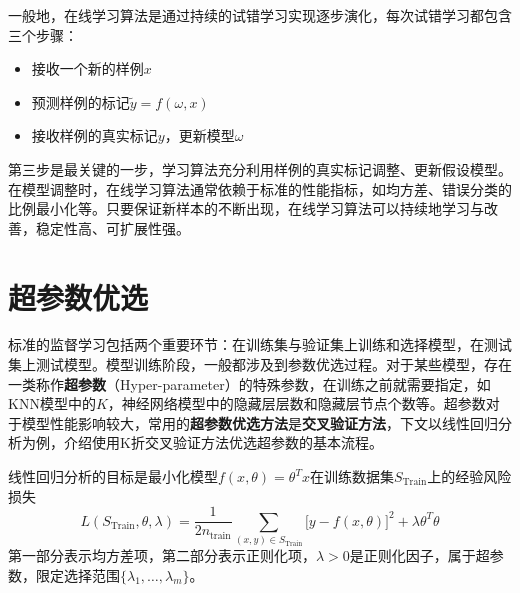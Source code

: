 一般地，在线学习算法是通过持续的试错学习实现逐步演化，每次试错学习都包含三个步骤：
\begin{itemize}
  \item 接收一个新的样例$x$
  \item 预测样例的标记$\tilde{y} = f(\omega,x)$
  \item 接收样例的真实标记$y$，更新模型$\omega$
\end{itemize}
第三步是最关键的一步，学习算法充分利用样例的真实标记调整、更新假设模型。在模型调整时，在线学习算法通常依赖于标准的性能指标，如均方差、错误分类的比例最小化等。只要保证新样本的不断出现，在线学习算法可以持续地学习与改善，稳定性高、可扩展性强。

\section{超参数优选}%
标准的监督学习包括两个重要环节：在训练集与验证集上训练和选择模型，在测试集上测试模型。模型训练阶段，一般都涉及到参数优选过程。对于某些模型，存在一类称作\textbf{超参数}（Hyper-parameter）的特殊参数，在训练之前就需要指定，如KNN模型中的$K$，神经网络模型中的隐藏层层数和隐藏层节点个数等。超参数对于模型性能影响较大，常用的\textbf{超参数优选方法}是\textbf{交叉验证方法}，下文以线性回归分析为例，介绍使用K折交叉验证方法优选超参数的基本流程。

线性回归分析的目标是最小化模型$f(x,\theta) = \theta^T x$在训练数据集$S_\textrm{Train}$上的经验风险损失
\begin{equation}
    L(S_\textrm{Train}, \theta, \lambda) = \frac{1}{2n_\textrm{train}} \sum\limits_{(x,y)\in S_\textrm{Train}} \big[y - f(x, \theta)\big]^2 + \lambda \theta^T \theta
\end{equation}
第一部分表示均方差项，第二部分表示正则化项，$\lambda>0$是正则化因子，属于超参数，限定选择范围$\{\lambda_1,\ldots,\lambda_m\}$。


